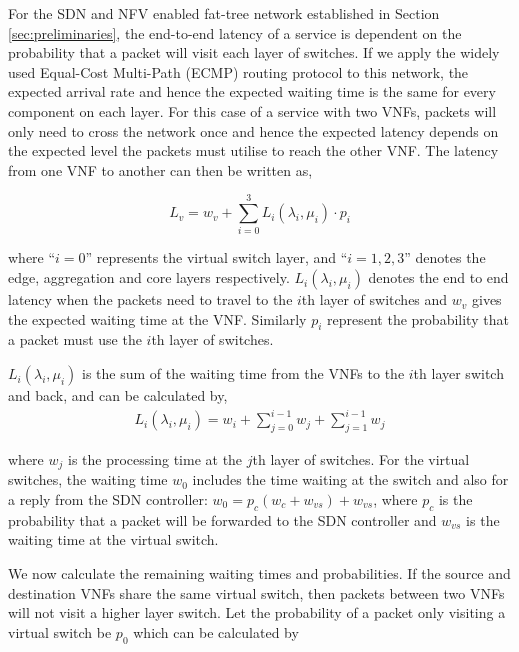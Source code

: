 For the SDN and NFV enabled fat-tree network established in Section \ref{sec:preliminaries}, the end-to-end latency of a service is dependent on the probability that a packet will visit each layer of switches. If we apply the widely used Equal-Cost Multi-Path (ECMP) \cite{ChiesaKS17} routing protocol to this network, the expected arrival rate and hence the expected waiting time is the same for every component on each layer. For this case of a service with two VNFs, packets will only need to cross the network once and hence the expected latency depends on the expected level the packets must utilise to reach the other VNF. The latency from one VNF to another can then be written as,

\begin{equation}
    \label{eq:mean_latency}
    L_v = w_v + \sum_{i=0}^3 L_i(\lambda_i, \mu_i) \cdot p_i
\end{equation}

\noindent where ``$i=0$'' represents the virtual switch layer, and ``$i=1,2,3$'' denotes the edge, aggregation and core layers respectively. $L_i(\lambda_i, \mu_i)$ denotes the end to end latency when the packets need to travel to the $i$th layer of switches and $w_v$ gives the expected waiting time at the VNF. Similarly $p_i$ represent the probability that a packet must use the $i$th layer of switches.

$L_i(\lambda_i, \mu_i)$ is the sum of the waiting time from the VNFs to the $i$th layer switch and back, and can be calculated by,
\begin{equation}
    \label{eq:latency_path}
    \begin{split}
        L_i(\lambda_i, \mu_i) = w_i + \sum_{j=0}^{i-1} w_j + \sum_{j=1}^{i-1} w_j
    \end{split}
\end{equation}

\noindent where $w_j$ is the processing time at the $j$th layer of switches. For the virtual switches, the waiting time $w_0$ includes the time waiting at the switch and also for a reply from the SDN controller: $w_0 = p_c (w_c + w_{vs}) + w_{vs}$, where $p_c$ is the probability that a packet will be forwarded to the SDN controller and $w_{vs}$ is the waiting time at the virtual switch.

We now calculate the remaining waiting times and probabilities. If the source and destination VNFs share the same virtual switch, then packets between two VNFs will not visit a higher layer switch. Let the probability of a packet only visiting a virtual switch be $p_0$ which can be calculated by

